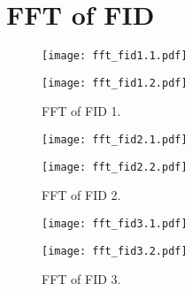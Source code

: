 \newpage
\section{FFT of FID}



\begin{figure}[!ht]
    \centering
    \begin{minipage}[b]{0.49\textwidth}
        \centering
        \texttt{[image: fft\_fid1.1.pdf]}
    \end{minipage}
    \hfill
    \begin{minipage}[b]{0.49\textwidth}
        \centering
        \texttt{[image: fft\_fid1.2.pdf]}
    \end{minipage}
    \caption{FFT of FID 1.}
\end{figure}

\newpage



\begin{figure}[!ht]
    \centering
    \begin{minipage}[b]{0.49\textwidth}
        \centering
        \texttt{[image: fft\_fid2.1.pdf]}
    \end{minipage}
    \hfill
    \begin{minipage}[b]{0.49\textwidth}
        \centering
        \texttt{[image: fft\_fid2.2.pdf]}
    \end{minipage}
    \caption{FFT of FID 2.}
\end{figure}

\newpage



\begin{figure}[!ht]
    \centering
    \begin{minipage}[b]{0.49\textwidth}
        \centering
        \texttt{[image: fft\_fid3.1.pdf]}
    \end{minipage}
    \hfill
    \begin{minipage}[b]{0.49\textwidth}
        \centering
        \texttt{[image: fft\_fid3.2.pdf]}
    \end{minipage}
    \caption{FFT of FID 3.}
\end{figure}

